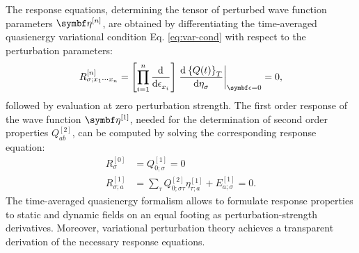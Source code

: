 The response equations, determining the tensor of
perturbed wave function parameters $\vect{\eta}^{[n]}$, are obtained by differentiating the
time-averaged quasienergy variational condition Eq.
\eqref{eq:var-cond} with respect to the perturbation parameters:\autocite{Olsen1985-nr, Helgaker1992-ph, Christiansen1998-pe}
\begin{equation}
 R_{\sigma;x_1\cdots x_n}^{[n]} = \left[\prod_{i=1}^n \deriv{}{\epsilon_{x_i}}\right]
\left. \deriv{\aveQ}{\eta_\sigma}\right|_{\vect{\epsilon}=0} = 0,
\end{equation}
followed by evaluation at zero perturbation strength.
The first order response of the wave function $\vect{\eta}^{[1]}$,
needed for the determination of second order properties
$Q_{ab}^{[2]}$, can be computed by solving the corresponding response
equation:
\begin{subequations}
 \begin{align}
 R_{\sigma}^{[0]} &= Q_{0;\sigma}^{[1]} = 0 \\
 R_{\sigma;a}^{[1]} &= \sum_{\tau}Q_{0;\sigma\tau}^{[2]}\eta_{\tau;a}^{[1]} + E_{a;\sigma}^{[1]} = 0.
 \label{eq:1st-order-response}
 \end{align}
\end{subequations}
The time-averaged quasienergy formalism allows to formulate response
properties to static and dynamic fields on an equal footing as
perturbation-strength derivatives.
Moreover, variational perturbation theory achieves a transparent
derivation of the necessary response equations.\autocite{Helgaker1992-ph}

